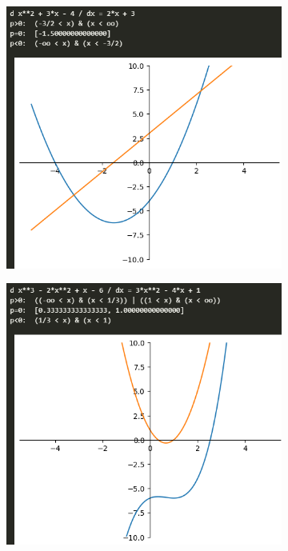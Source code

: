 \documentclass[14pt,a4paper]{extarticle}
\begin{document}
\begin{figure}[ht!]
    \centering
    \begin{subfigure}{.333\textwidth}
        \centering
        \includegraphics[width=\linewidth]{figures/1-1.png}
    \end{subfigure}%
    \begin{subfigure}{.333\textwidth}
        \centering
        \includegraphics[width=\linewidth]{figures/1-2.png}

\end{subfigure}
\end{figure}
\end{document}
